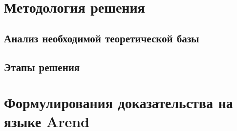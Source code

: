 \documentclass[times,specification,annotation]{itmo-student-thesis}
\begin{document}





\chapter{Методология решения}
\todo
\section{Анализ необходимой теоретической базы}
\todo
\section{Этапы решения}
\todo

\chapterconclusion

\chapter{Формулирования доказательства на языке Arend}
\todo
\end{document}
